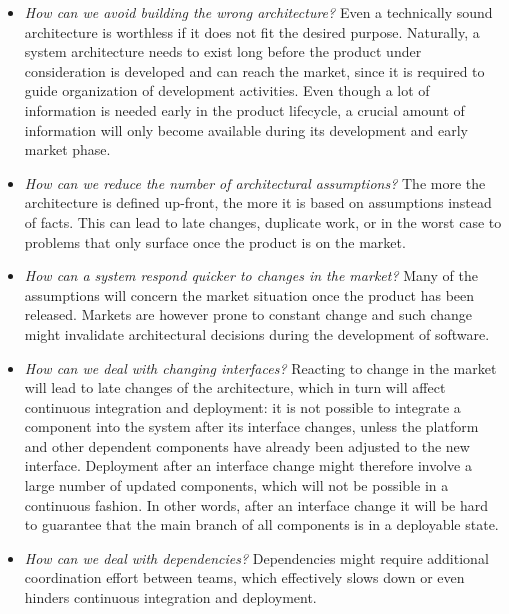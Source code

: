 \begin{itemize}
\item \emph{How can we avoid building the wrong architecture?}
{Even a technically sound architecture is worthless if it does not fit the desired purpose.
Naturally, a system architecture needs to exist long before the product under consideration is developed and can reach the market, since it is required to guide organization of development activities. 
Even though a lot of information is needed early in the product lifecycle, a crucial amount of information will only become available during its development and early market phase.}
\item \emph{How can we reduce the number of architectural assumptions?} The more the architecture 
is defined up-front,  the more 
it is based on 
assumptions 
instead of facts. 
{This can lead to late changes, duplicate work, or in the worst case to problems that only surface once the product is on the market.}
\item \emph{How can %
{a system} respond quicker to changes in the market?} 
{Many of the assumptions will concern the market situation once the product has been released. 
Markets are however prone to constant change and such change might invalidate architectural decisions during the development of software. }
\item \emph{How can we deal with changing interfaces?} {Reacting to change in the market will lead to late changes of the architecture, which in turn will affect continuous integration and deployment: it is not possible to integrate a component into the system after its interface changes, unless the platform and other dependent components have already been adjusted to the new interface.
Deployment after an interface change might therefore involve a large number of updated components, which will not be possible in a continuous fashion. 
In other words, after an interface change it will be hard to guarantee that the main branch of all components is in a deployable state.}
\item \emph{How can we deal with dependencies?}
Dependencies might require additional coordination effort between teams, which effectively slows down or even hinders continuous integration and deployment.

\end{itemize}
